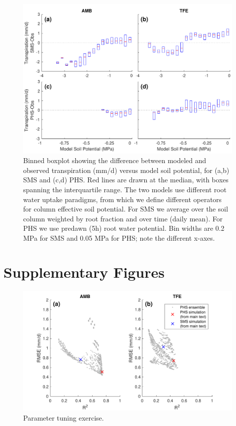 \documentclass[draft,linenumbers]{agujournal}
\begin{document}
              \begin{figure}[h]
     \centering
     \includegraphics[width=30pc]{../figs3/sm3.pdf}
     \caption{Binned boxplot showing the difference between modeled and observed transpiration (mm/d) versus model soil potential, for (a,b) SMS and (c,d) PHS.
     Red lines are drawn at the median, with boxes spanning the interquartile range.
     The two models use different root water uptake paradigms, from which we define different operators for column effective soil potential.
     For SMS we average over the soil column weighted by root fraction and over time (daily mean).
     For PHS we use predawn (5h) root water potential.
     Bin widths are 0.2 MPa for SMS and 0.05 MPa for PHS; note the different x-axes. 
}
     \label{fig:cool}
  \end{figure}
          \clearpage

\clearpage

\appendix

\section{Supplementary Figures}


      \begin{figure}[h]
     \centering
     \includegraphics[width=30pc]{../figs3/ens.pdf}
     \caption{Parameter tuning exercise.
     }
     \label{supp:ens}
       \end{figure}
         \clearpage
\end{document}
